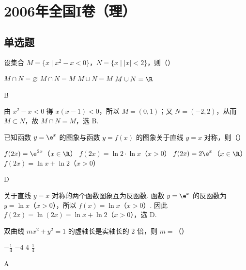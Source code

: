 \chapter{2006年全国I卷（理）}

\section{单选题}

\begin{problem}
设集合 \(M = \{x \mid x^2 - x < 0\}\)，\(N = \{x \mid |x| < 2\}\)，则（\quad）

\choices
    {\(M \cap N = \varnothing\)}
    {\(M \cap N = M\)}
    {\(M \cup N = M\)}
    {\(M \cup N = \R\)}
\end{problem}

\begin{answer}
B
\end{answer}

\begin{solution}
由 \(x^2-x<0\) 得 \(x(x-1)<0\)，所以 \(M=(0,1)\)；又 \(N=(-2,2)\)，从而 \(M\subset N\)，故 \(M\cap N=M\)，选 B.
\end{solution}

\begin{problem}
已知函数 \(y = \e^x\) 的图象与函数 \(y = f(x)\) 的图象关于直线 \(y = x\) 对称，则（\quad）

\choices
    {\(f(2x) = \e^{2x}\)（\(x \in \R\)）}
    {\(f(2x) = \ln 2\cdot\ln x\)（\(x > 0\)）}
    {\(f(2x) = 2\e^x\)（\(x \in \R\)）}
    {\(f(2x) = \ln x + \ln 2\)（\(x > 0\)）}
\end{problem}

\begin{answer}
D
\end{answer}

\begin{solution}
关于直线 \(y=x\) 对称的两个函数图象互为反函数. 函数 \(y=\e^x\) 的反函数为 \(y=\ln x\)（\(x>0\)），所以 \(f(x)=\ln x\)（\(x>0\)）. 因此 \(f(2x)=\ln(2x)=\ln x+\ln2\)（\(x>0\)），选 D.
\end{solution}

\begin{problem}
双曲线 \(mx^2 + y^2 = 1\) 的虚轴长是实轴长的 \(2\) 倍，则 \(m=\)（\quad）

\choices
    {\(-\frac{1}{4}\)}
    {\(-4\)}
    {\(4\)}
    {\(\frac{1}{4}\)}
\end{problem}

\begin{answer}
A
\end{answer}

